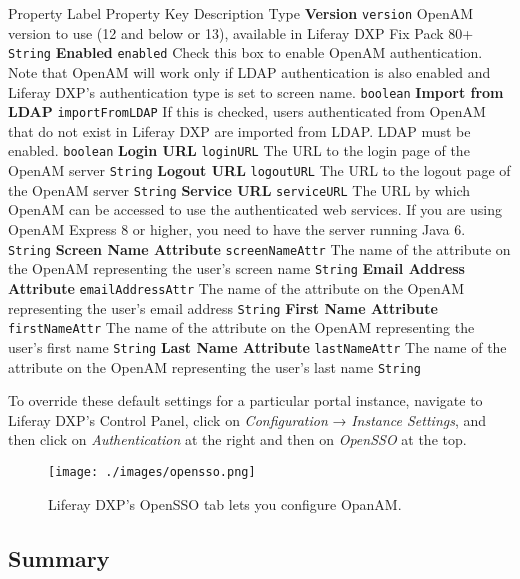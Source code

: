Property Label \textbar{} Property Key \textbar{} Description \textbar{}
Type \textbf{Version} \textbar{} \texttt{version} \textbar{} OpenAM
version to use (12 and below or 13), available in Liferay DXP Fix Pack
80+ \textbar{} \texttt{String} \textbf{Enabled} \textbar{}
\texttt{enabled} \textbar{} Check this box to enable OpenAM
authentication. Note that OpenAM will work only if LDAP authentication
is also enabled and Liferay DXP's authentication type is set to screen
name. \textbar{} \texttt{boolean} \textbf{Import from LDAP} \textbar{}
\texttt{importFromLDAP} \textbar{} If this is checked, users
authenticated from OpenAM that do not exist in Liferay DXP are imported
from LDAP. LDAP must be enabled. \textbar{} \texttt{boolean}
\textbf{Login URL} \textbar{} \texttt{loginURL} \textbar{} The URL to
the login page of the OpenAM server \textbar{} \texttt{String}
\textbf{Logout URL} \textbar{} \texttt{logoutURL} \textbar{} The URL to
the logout page of the OpenAM server \textbar{} \texttt{String}
\textbf{Service URL} \textbar{} \texttt{serviceURL} \textbar{} The URL
by which OpenAM can be accessed to use the authenticated web services.
If you are using OpenAM Express 8 or higher, you need to have the server
running Java 6. \textbar{} \texttt{String} \textbf{Screen Name
Attribute} \textbar{} \texttt{screenNameAttr} \textbar{} The name of the
attribute on the OpenAM representing the user's screen name \textbar{}
\texttt{String} \textbf{Email Address Attribute} \textbar{}
\texttt{emailAddressAttr} \textbar{} The name of the attribute on the
OpenAM representing the user's email address \textbar{} \texttt{String}
\textbf{First Name Attribute} \textbar{} \texttt{firstNameAttr}
\textbar{} The name of the attribute on the OpenAM representing the
user's first name \textbar{} \texttt{String} \textbf{Last Name
Attribute} \textbar{} \texttt{lastNameAttr} \textbar{} The name of the
attribute on the OpenAM representing the user's last name \textbar{}
\texttt{String}

To override these default settings for a particular portal instance,
navigate to Liferay DXP's Control Panel, click on \emph{Configuration} →
\emph{Instance Settings}, and then click on \emph{Authentication} at the
right and then on \emph{OpenSSO} at the top.

\begin{figure}
\centering
\texttt{[image: ./images/opensso.png]}
\caption{Liferay DXP's OpenSSO tab lets you configure OpanAM.}
\end{figure}

\subsection{Summary}\label{summary-4}

